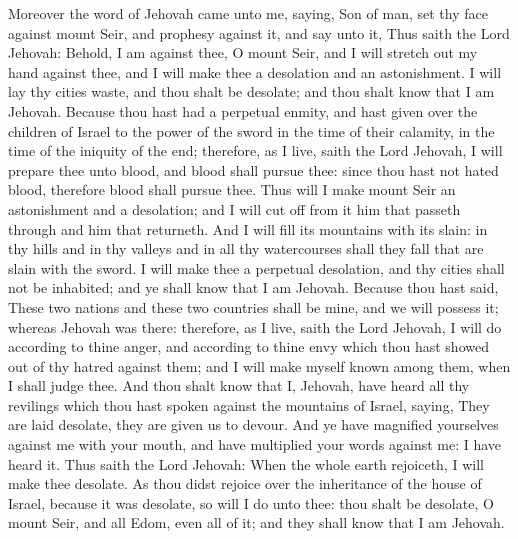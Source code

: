 Moreover the word of Jehovah came unto me, saying, Son of man, set thy face against mount Seir, and prophesy against it, and say unto it, Thus saith the Lord Jehovah: Behold, I am against thee, O mount Seir, and I will stretch out my hand against thee, and I will make thee a desolation and an astonishment. I will lay thy cities waste, and thou shalt be desolate; and thou shalt know that I am Jehovah. Because thou hast had a perpetual enmity, and hast given over the children of Israel to the power of the sword in the time of their calamity, in the time of the iniquity of the end; therefore, as I live, saith the Lord Jehovah, I will prepare thee unto blood, and blood shall pursue thee: since thou hast not hated blood, therefore blood shall pursue thee. Thus will I make mount Seir an astonishment and a desolation; and I will cut off from it him that passeth through and him that returneth. And I will fill its mountains with its slain: in thy hills and in thy valleys and in all thy watercourses shall they fall that are slain with the sword. I will make thee a perpetual desolation, and thy cities shall not be inhabited; and ye shall know that I am Jehovah.  Because thou hast said, These two nations and these two countries shall be mine, and we will possess it; whereas Jehovah was there: therefore, as I live, saith the Lord Jehovah, I will do according to thine anger, and according to thine envy which thou hast showed out of thy hatred against them; and I will make myself known among them, when I shall judge thee. And thou shalt know that I, Jehovah, have heard all thy revilings which thou hast spoken against the mountains of Israel, saying, They are laid desolate, they are given us to devour. And ye have magnified yourselves against me with your mouth, and have multiplied your words against me: I have heard it. Thus saith the Lord Jehovah: When the whole earth rejoiceth, I will make thee desolate. As thou didst rejoice over the inheritance of the house of Israel, because it was desolate, so will I do unto thee: thou shalt be desolate, O mount Seir, and all Edom, even all of it; and they shall know that I am Jehovah. 

